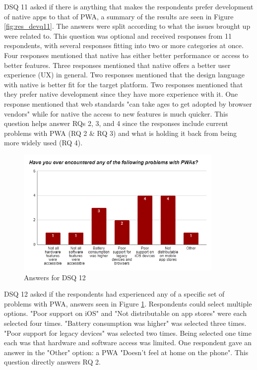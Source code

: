 \documentclass[a4paper,12pt]{article}
\begin{document}
DSQ 11 asked if there is anything that makes the respondents prefer development of native apps to that of PWA, a summary of the results are seen in Figure \ref{fig:res_devq11}. The answers were split according to what the issues brought up were related to. This question was optional and received responses from 11 respondents, with several responses fitting into two or more categories at once. Four responses mentioned that native has either better performance or access to better features. Three responses mentioned that native offers a better user experience (UX) in general. Two responses mentioned that the design language with native is better fit for the target platform. Two responses mentioned that they prefer native development since they have more experience with it. One response mentioned that web standards "can take ages to get adopted by browser vendors" while for native the access to new features is much quicker. This question helps answer RQs 2, 3, and 4 since the responses include current problems with PWA (RQ 2 \& RQ 3) and what is holding it back from being more widely used (RQ 4).

\begin{figure}[ht!]
    \centering
    \includegraphics[width=10cm]{img/Results/dsq12.png}
    \caption{Answers for DSQ 12}
    \label{fig:res_devq12}
\end{figure}

DSQ 12 asked if the respondents had experienced any of a specific set of problems with PWA, answers seen in Figure \ref{fig:res_devq12}. Respondents could select multiple options. "Poor support on iOS" and "Not distributable on app stores" were each selected four times. "Battery consumption was higher" was selected three times. "Poor support for legacy devices" was selected two times. Being selected one time each was that hardware and software access was limited. One respondent gave an answer in the "Other" option: a PWA "Doesn't feel at home on the phone". This question directly answers RQ 2.
\end{document}

